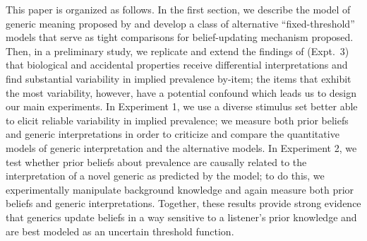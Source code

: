 \documentclass[floatsintext,doc]{apa6}
\begin{document}
This paper is organized as follows.
In the first section, we describe the model of generic meaning proposed by  and develop a class of alternative ``fixed-threshold'' models that serve as tight comparisons for belief-updating mechanism proposed.
Then, in a preliminary study, we replicate and extend the findings of  (Expt.~3) that biological and accidental properties receive differential interpretations and find substantial variability in implied prevalence by-item; the items that exhibit the most variability, however, have a potential confound which leads us to design our main experiments.
In Experiment 1, we use a diverse stimulus set better able to elicit reliable variability in implied prevalence; we measure both prior beliefs and generic interpretations in order to criticize and compare the quantitative models of generic interpretation and the alternative models. 
In Experiment 2, we test whether prior beliefs about prevalence are causally related to the interpretation of a novel generic as predicted by the model; to do this, we experimentally manipulate background knowledge and again measure both prior beliefs and generic interpretations. 
Together, these results provide strong evidence that generics update beliefs in a way sensitive to a listener's prior knowledge and are best modeled as an uncertain threshold function. 



\end{document}
